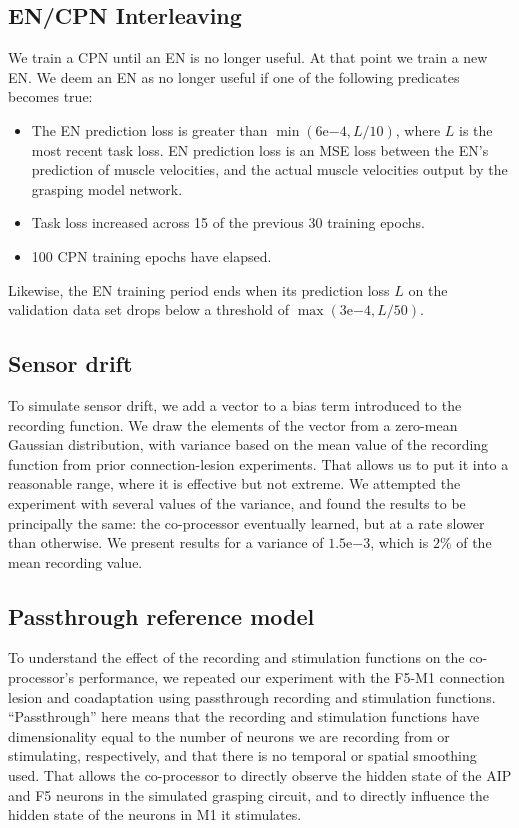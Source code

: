 \documentclass[12pt]{iopart}
\begin{document}
\subsection{EN/CPN Interleaving}
\label{sup:encpninter}
We train a CPN until an EN is no longer useful. At that point we train a new EN. We deem an EN
as no longer useful if one of the following predicates becomes true:

\begin{itemize}
	\item The EN prediction loss is greater than $\min(6\mathrm{e}{-4}, L/10)$, where $L$ is the most recent
	      task loss. EN prediction loss is an MSE loss between the EN's prediction of muscle
	      velocities, and the actual muscle velocities output by the grasping model network.
	\item Task loss increased across 15 of the previous 30 training epochs.
	\item 100 CPN training epochs have elapsed.
\end{itemize}

Likewise, the EN training period ends when its prediction loss $L$ on the validation data set drops
below a threshold of $\max(3\mathrm{e}{-4}, L/50)$.

\subsection{Sensor drift}
\label{sup:drift}
To simulate sensor drift, we add a vector to a bias term introduced to the recording function.
We draw the elements of the vector from a zero-mean Gaussian distribution, with variance based
on the mean value of the recording function from prior connection-lesion experiments. That
allows us to put it into a reasonable range, where it is effective but not extreme. We attempted
the experiment with several values of the variance, and found the results to be principally the same:
the co-processor eventually learned, but at a rate slower than otherwise. We present results for
a variance of $1.5\mathrm{e}{-3}$, which is $2\%$ of the mean recording value.

\subsection{Passthrough reference model}
\label{sup:passthrough}

To understand the effect of the recording and stimulation functions on the co-processor's performance, 
we repeated our experiment with the F5-M1 connection lesion and coadaptation using passthrough recording
and stimulation functions. ``Passthrough'' here means that the recording and stimulation functions have
dimensionality equal to the number of neurons we are recording from or stimulating, respectively, and that
there is no temporal or spatial smoothing used. That allows the co-processor to directly observe the hidden
state of the AIP and F5 neurons in the simulated grasping circuit, and to directly influence the hidden state
of the neurons in M1 it stimulates.
\end{document}
